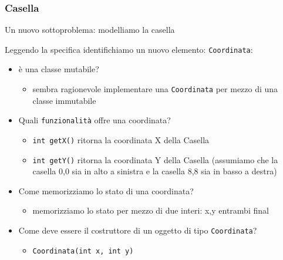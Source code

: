 \documentclass{article}
\begin{document}
\subsubsection{Casella}
Un nuovo sottoproblema: modelliamo la casella

Leggendo la specifica identifichiamo un nuovo elemento: \texttt{Coordinata}: 

\begin{itemize}
\item \`e una classe mutabile?
\begin{itemize}
\item sembra ragionevole implementare una \texttt{Coordinata} per mezzo di una classe immutabile
\end{itemize}
\item Quali \texttt{funzionalit\`a} offre una coordinata? 
\begin{itemize}
\item \texttt{int getX()} ritorna la coordinata X della Casella
\item \texttt{int getY()} ritorna la coordinata Y della Casella (assumiamo che la casella 0,0 sia in alto a sinistra e la casella 8,8 sia in basso a destra)
\end{itemize}
\item Come memorizziamo lo stato di una coordinata?
\begin{itemize}
\item memorizziamo lo stato per mezzo di due interi: x,y entrambi final
\end{itemize}
\item Come deve essere il costruttore di un oggetto di tipo \texttt{Coordinata}?
\begin{itemize}
\item \texttt{Coordinata(int x, int y)}
\end{itemize}
\end{itemize}


\end{document}
